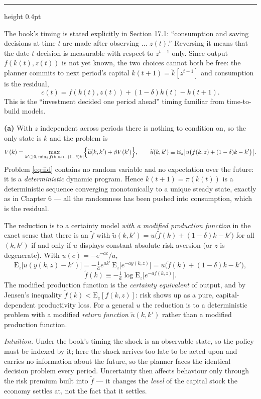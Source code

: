 \documentclass[11pt,letterpaper,reqno]{amsart}
\makeatletter
\newcommand{\E}{\mathrm{E}}                  %
\newcommand{\wt}[1]{\widetilde{#1}}
\newcommand{\as@head}[3]{%
  \par\addvspace{1.6ex}\penalty-200\relax
  \phantomsection
  \addcontentsline{toc}{subsection}{#1 #2\texorpdfstring{\ifx\relax#3\relax\else\quad #3\fi}{}}%
  {\color{RuleGrey}\hrule height 0.4pt}%
  \nobreak\vspace{0.8ex}\nobreak
  \noindent{\bfseries #1 #2}%
  \ifx\relax#3\relax\else\quad{\bfseries\itshape #3}\fi
  \par\nobreak\vspace{0.4ex}\nobreak
  \as@beginstatement
}
\newcommand{\as@beginstatement}{\begingroup\itshape\ignorespaces}
\newenvironment{aex}[2]{\as@head{Exercise}{#1}{#2}}{\par\addvspace{1.2ex}}
\renewcommand{\as@beginstatement}{\ignorespaces}
\makeatother
\begin{document}
\begin{aex}{17.2}{}
The book's timing is stated explicitly in Section 17.1: ``consumption and saving decisions at
time $t$ are made after observing $\ldots$ $z(t)$.''  Reversing it means that the date-$t$
decision is measurable with respect to $z^{t-1}$ only.  Since output $f(k(t),z(t))$ is not yet
known, the two choices cannot both be free: the planner commits to next period's capital
$k(t+1)=\wt k[z^{t-1}]$ and consumption is the residual,
\[
c(t)=f(k(t),z(t))+(1-\delta)k(t)-k(t+1) .
\]
This is the ``investment decided one period ahead'' timing familiar from time-to-build models.

\textbf{(a)}  With $z$ independent across periods there is nothing to condition on, so the
only state is $k$ and the problem is
\begin{equation}
V(k)=\max_{k'\in[0,\,\min_j f(k,z_j)+(1-\delta)k]}
\Bigl\{\wt u(k,k')+\beta V(k')\Bigr\},\qquad
\wt u(k,k')\equiv\E_z\bigl[u\bigl(f(k,z)+(1-\delta)k-k'\bigr)\bigr].
\label{eq:iid}
\end{equation}
Problem \eqref{eq:iid} contains no random variable and no expectation over the future: it is a
\emph{deterministic} dynamic program.  Hence $k(t+1)=\pi(k(t))$ is a deterministic sequence
converging monotonically to a unique steady state, exactly as in Chapter 6 --- all the
randomness has been pushed into consumption, which is the residual.

The reduction is to a certainty model \emph{with a modified production function} in the exact
sense that there is an $\wt f$ with
$\wt u(k,k')=u\bigl(\wt f(k)+(1-\delta)k-k'\bigr)$ for all $(k,k')$ if and only if $u$
displays constant absolute risk aversion (or $z$ is degenerate).  With
$u(c)=-e^{-ac}/a$,
\[
\E_z\bigl[u(y(k,z)-k')\bigr]=-\tfrac1a e^{ak'}\,\E_z\bigl[e^{-ay(k,z)}\bigr]
=u\bigl(\wt f(k)+(1-\delta)k-k'\bigr),
\]
\[
\boxed{\ \wt f(k)\equiv-\tfrac1a\log\E_z\bigl[e^{-af(k,z)}\bigr] . \ }
\]
The modified production function is the \emph{certainty equivalent} of output, and by Jensen's
inequality $\wt f(k)<\E_z[f(k,z)]$: risk shows up as a pure, capital-dependent productivity
loss.  For a general $u$ the reduction is to a deterministic problem with a modified
\emph{return function} $\wt u(k,k')$ rather than a modified production function.

\emph{Intuition.}  Under the book's timing the shock is an observable state, so the policy must
be indexed by it; here the shock arrives too late to be acted upon and carries no information
about the future, so the planner faces the identical decision problem every period.  Uncertainty
then affects behaviour only through the risk premium built into $\wt f$ --- it changes the
\emph{level} of the capital stock the economy settles at, not the fact that it settles.


\end{aex}
\end{document}
